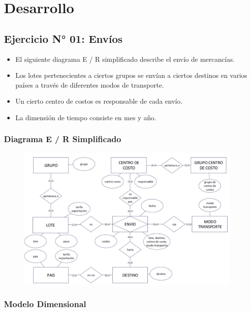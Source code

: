\documentclass[12pt,letterpaper]{article}
\begin{document}
\section{Desarrollo}
\subsection{Ejercicio N° 01: Envíos}

\begin{itemize}
	\item El siguiente diagrama E / R simplificado describe el envío de mercancías.
	\item Los lotes pertenecientes a ciertos grupos se envían a ciertos destinos en varios países a través de diferentes modos de transporte. 
	\item Un cierto centro de costos es responsable de cada envío. 
	\item La dimensión de tiempo consiste en mes y año.
\end{itemize}
\newpage
\subsubsection{\textbf{Diagrama E / R Simplificado}}

	\begin{figure}[htb]
		\begin{center}
			\includegraphics[width=13.5cm]{./IMAGENES/Ejercicio_1}
		\end{center}
	\end{figure}

\subsubsection{\textbf{Modelo Dimensional }}
\end{document}
